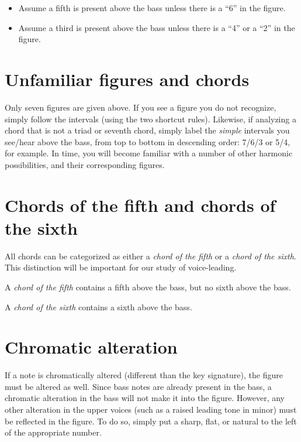 \documentclass{book}
\providecommand{\tightlist}{%
  \setlength{\itemsep}{0pt}\setlength{\parskip}{0pt}}
\begin{document}
\begin{itemize}
\tightlist
\item
  Assume a fifth is present above the bass unless there is a ``6'' in the
  figure.\\
\item
  Assume a third is present above the bass unless there is a ``4'' or a ``2''
  in the figure.
\end{itemize}

\hypertarget{unfamiliar-figures-and-chords}{%
\section{Unfamiliar figures and chords}\label{unfamiliar-figures-and-chords}}

Only seven figures are given above. If you see a figure you do not recognize,
simply follow the intervals (using the two shortcut rules). Likewise, if
analyzing a chord that is not a triad or seventh chord, simply label the
\emph{simple} intervals you see/hear above the bass, from top to bottom in
descending order: 7/6/3 or 5/4, for example. In time, you will become familiar
with a number of other harmonic possibilities, and their corresponding
figures.

\hypertarget{chords-of-the-fifth-and-chords-of-the-sixth}{%
\section{Chords of the fifth and chords of the
sixth}\label{chords-of-the-fifth-and-chords-of-the-sixth}}

All chords can be categorized as either a \emph{chord of the fifth} or a
\emph{chord of the sixth}. This distinction will be important for our study of
voice-leading.

A \emph{chord of the fifth} contains a fifth above the bass, but no sixth
above the bass.

A \emph{chord of the sixth} contains a sixth above the bass.

\hypertarget{chromatic-alteration}{%
\section{Chromatic alteration}\label{chromatic-alteration}}

If a note is chromatically altered (different than the key signature), the
figure must be altered as well. Since bass notes are already present in the
bass, a chromatic alteration in the bass will not make it into the figure.
However, any other alteration in the upper voices (such as a raised leading
tone in minor) must be reflected in the figure. To do so, simply put a sharp,
flat, or natural to the left of the appropriate number.
\end{document}
